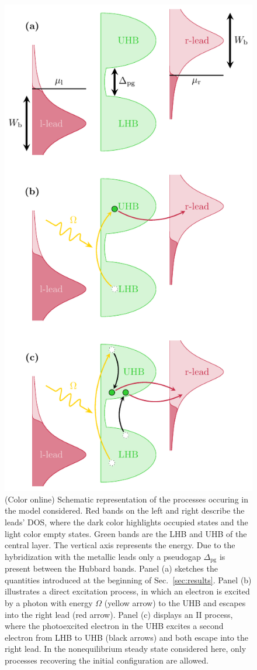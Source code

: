 \documentclass[aps,prb,groupedaddress,showpacs,twocolumn,superscriptaddress,10pt]{revtex4-2}
\begin{document}
\begin{figure}[t]    
\includegraphics[width=0.8\linewidth]{Fig2.pdf}
\caption{(Color online) Schematic representation of the processes occuring in the model considered. Red bands on the left and right describe the leads' DOS, where the dark color highlights occupied states and the light color empty states. Green bands are the LHB and UHB of the central layer. The vertical axis represents the energy. Due to the hybridization with the metallic leads only a pseudogap $\Delta_{\text{pg}}$ is present between the Hubbard bands. Panel (a) sketches the quantities introduced at the beginning of Sec.~\ref{sec:results}. Panel (b) illustrates a direct excitation process, in which an electron is excited by a photon with energy $\Omega$ (yellow arrow) to the UHB and escapes into the right lead (red arrow). Panel (c) displays an II process, where the photoexcited electron in the UHB excites a second electron from LHB to UHB (black arrows) and both escape into the right lead. In the nonequilibrium steady state considered here, only processes recovering the initial configuration are allowed.} 
\label{fig:energy_setup}
\end{figure}
   
\end{document}
